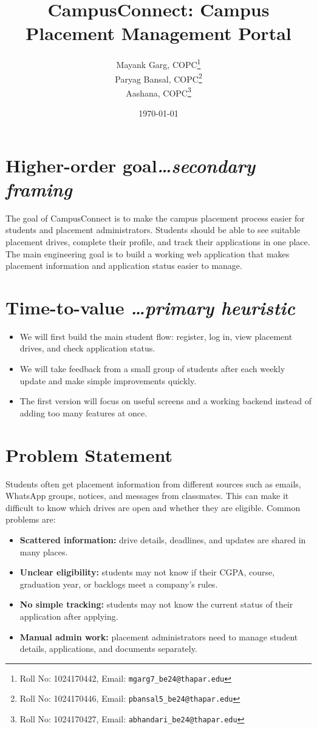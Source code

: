 \documentclass[11pt,a4paper]{article}
\title{CampusConnect: Campus Placement Management Portal}
\author{%
  Mayank Garg, COPC\thanks{Roll No: 1024170442, Email: \texttt{mgarg7\_be24@thapar.edu}}\\
  Paryag Bansal, COPC\thanks{Roll No: 1024170446, Email: \texttt{pbansal5\_be24@thapar.edu}}\\
  Aashana, COPC\thanks{Roll No: 1024170427, Email: \texttt{abhandari\_be24@thapar.edu}}%
}
\date{\today}
\newcommand{\BvrHint}[1]{{\normalfont\normalsize\itshape\hfill #1}}
\begin{document}
\maketitle

\section{Higher-order goal\BvrHint{\ldots secondary framing}}
The goal of CampusConnect is to make the campus placement process easier for students and placement administrators. Students should be able to see suitable placement drives, complete their profile, and track their applications in one place. The main engineering goal is to build a working web application that makes placement information and application status easier to manage.

\section{Time-to-value \BvrHint{\ldots primary heuristic}}
\begin{itemize}[leftmargin=0.7cm]
  \item We will first build the main student flow: register, log in, view placement drives, and check application status.
  \item We will take feedback from a small group of students after each weekly update and make simple improvements quickly.
  \item The first version will focus on useful screens and a working backend instead of adding too many features at once.
\end{itemize}

\section{Problem Statement}
Students often get placement information from different sources such as emails, WhatsApp groups, notices, and messages from classmates. This can make it difficult to know which drives are open and whether they are eligible. Common problems are:
\begin{itemize}[leftmargin=0.7cm]
  \item \textbf{Scattered information:} drive details, deadlines, and updates are shared in many places.
  \item \textbf{Unclear eligibility:} students may not know if their CGPA, course, graduation year, or backlogs meet a company's rules.
  \item \textbf{No simple tracking:} students may not know the current status of their application after applying.
  \item \textbf{Manual admin work:} placement administrators need to manage student details, applications, and documents separately.
\end{itemize}
\end{document}
